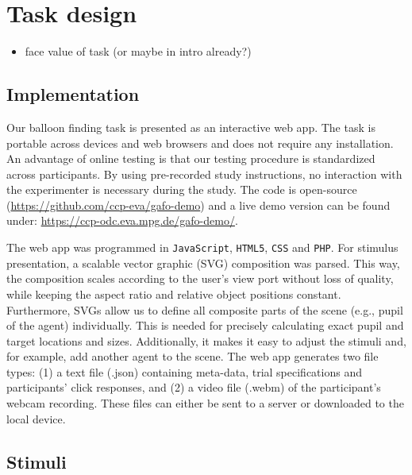 \documentclass[
  man,floatsintext]{apa6}
\providecommand{\tightlist}{%
  \setlength{\itemsep}{0pt}\setlength{\parskip}{0pt}}
\begin{document}
\hypertarget{task-design}{%
\section{Task design}\label{task-design}}

\begin{itemize}
\tightlist
\item
  face value of task (or maybe in intro already?)
\end{itemize}

\hypertarget{implementation}{%
\subsection{Implementation}\label{implementation}}

Our balloon finding task is presented as an interactive web app. The task is portable across devices and web browsers and does not require any installation. An advantage of online testing is that our testing procedure is standardized across participants. By using pre-recorded study instructions, no interaction with the experimenter is necessary during the study. The code is open-source (\url{https://github.com/ccp-eva/gafo-demo}) and a live demo version can be found under: \url{https://ccp-odc.eva.mpg.de/gafo-demo/}.

The web app was programmed in \texttt{JavaScript}, \texttt{HTML5}, \texttt{CSS} and \texttt{PHP}. For stimulus presentation, a scalable vector graphic (SVG) composition was parsed. This way, the composition scales according to the user's view port without loss of quality, while keeping the aspect ratio and relative object positions constant. Furthermore, SVGs allow us to define all composite parts of the scene (e.g., pupil of the agent) individually. This is needed for precisely calculating exact pupil and target locations and sizes. Additionally, it makes it easy to adjust the stimuli and, for example, add another agent to the scene. The web app generates two file types: (1) a text file (.json) containing meta-data, trial specifications and participants' click responses, and (2) a video file (.webm) of the participant's webcam recording. These files can either be sent to a server or downloaded to the local device.

\hypertarget{stimuli}{%
\subsection{Stimuli}\label{stimuli}}
\end{document}

